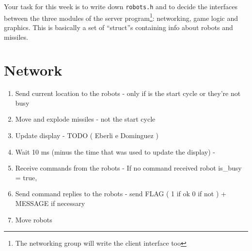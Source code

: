 \documentclass{article}
\begin{document}
       Your task for this week is to write down \texttt{robots.h} and
       to decide the interfaces between the three modules of the server
       program\footnote{The networking group will write the client
         interface too}: networking, game logic and graphics.  This is
       basically a set of ``struct''s containing info about robots and
       missiles.
       
\section{Network}

      \begin{enumerate}
        \item Send current location to the robots - only if is the start cycle or they're not busy
        \item Move and explode missiles - not the start cycle
        \item Update display - TODO ( Eberli e Dominguez )
        \item Wait 10 ms (minus the time that was used to update the display) -  
        \item Receive commands from the robots - If no command received robot is_busy = true, 
        \item Send command replies to the robots - send FLAG ( 1 if ok 0 if not  ) + MESSAGE if necessary
        \item Move robots
        \end{enumerate}
\end{document}
